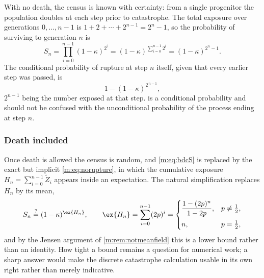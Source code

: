 With no death, the census is known with certainty: from a single progenitor the
population doubles at each step prior to catastrophe. The total exposure over
generations $0,\dots,n-1$ is $1+2+\cdots+2^{n-1} = 2^n-1$, so the probability of
surviving to generation $n$ is
\begin{equation}
\label{m:eq:bdcS}
S_n = \prod_{i=0}^{n-1}(1-\kappa)^{2^i}
= (1-\kappa)^{\sum_{i=0}^{n-1}2^i}
= (1-\kappa)^{2^n-1} .
\end{equation}
The conditional probability of rupture at step $n$ itself, given that every earlier
step was passed, is
\begin{equation}
\label{m:eq:bdchalt}
1-(1-\kappa)^{2^{\,n-1}},
\end{equation}
$2^{n-1}$ being the number exposed at that step.  is a
conditional probability and should not be confused with the unconditional
probability of the process ending at step $n$.

\subsubsection*{Death included}

Once death is allowed the census is random, and \cref{m:eq:bdcS} is replaced by the
exact but implicit \cref{m:eq:norupture}, in which the cumulative exposure
$H_n = \sum_{i=0}^{n-1}\widetilde Z_i$ appears inside an expectation. The natural
simplification replaces $H_n$ by its mean,
\begin{equation}
\label{m:eq:bdcguess}
S_n\overset{?}{=}(1-\kappa)^{\ex{H_n}},
\qquad
\ex{H_n} = \sum_{i=0}^{n-1}(2p)^i
= \begin{cases}
\dfrac{1-(2p)^n}{1-2p}, & p\neq\tfrac12,\\[8pt]
n, & p=\tfrac12,
\end{cases}
\end{equation}
and by the Jensen argument of \cref{m:rem:notmeanfield} this is a lower bound rather
than an identity. How tight a bound remains a question for numerical work; a sharp
answer would make the discrete catastrophe calculation usable in its own right
rather than merely indicative.

